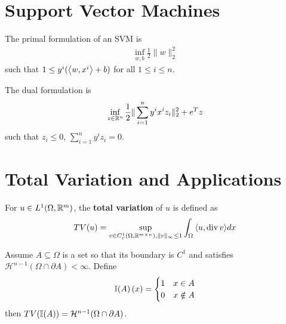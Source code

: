 \section{Support Vector Machines}
\label{sec:supp-vect-mach}

\begin{defn}
  \label{sec:supp-vect-mach-1}
  The primal formulation of an SVM is
  \begin{align}
    \label{eq:18}
    \inf_{w, b} \frac{1}{2} \| w \|_{2}^{2}
  \end{align} such that $1 \leq y^{i} (\IP{w, x^{i}} + b)$ for all $1
  \leq i \leq n$.

  The dual formulation is
  \begin{align}
    \label{eq:48}
    \inf_{z \in \mathbb{R}^{n}} \frac{1}{2} \| \sum_{i=1}^{n} y^{i} x^{i}
    z_{i} \|_{2}^{2} + e^{T} z
  \end{align} such that $z_{i} \leq 0$, $\sum_{i=1}^{n} y^{i} z_{i} = 0$.
\end{defn}

\section{Total Variation and Applications}
\label{sec:total-vari-appl}

\begin{defn}
  \label{sec:total-vari-appl-1}
  For $u \in L^{1}(\Omega, \mathbb{R}^{m})$, the \textbf{total variation} of
  $u$ is defined as
  \begin{equation}
    \label{eq:50}
    TV(u)= \sup_{v \in C_{c}^{1}(\Omega, \R^{m \times n}), \| v
      \|_{\infty} \leq 1} \int_{\Omega} \IP{u, \divergence v} dx
  \end{equation}
\end{defn}

\begin{thm}
  \label{sec:total-vari-appl-2}
  Assume $A \subseteq \Omega$ is a set so that its boundary is $C^{1}$
  and satisfies $\mathcal{H}^{n-1}(\Omega \cap \partial A) < \infty$.
  Define
  \begin{equation}
    \label{eq:51}
    \I{A}(x) =
    \begin{cases}
      1 & x \in A \\
      0 & x \notin A
    \end{cases}
  \end{equation}
  then $TV(\I{A}) = \mathcal{H}^{n-1}(\Omega \cap \partial A)$.
\end{thm}

